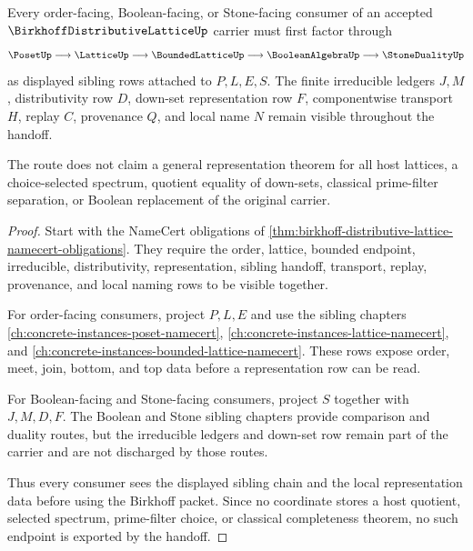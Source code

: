 \begin{theorem}
\label{thm:birkhoff-distributive-lattice-sibling-handoff}
Every order-facing, Boolean-facing, or Stone-facing consumer of an accepted $\BirkhoffDistributiveLatticeUp$ carrier must first factor through
$$
\PosetUp \longrightarrow \LatticeUp \longrightarrow \BoundedLatticeUp \longrightarrow \BooleanAlgebraUp \longrightarrow \StoneDualityUp
$$
as displayed sibling rows attached to $P,L,E,S$. The finite irreducible ledgers $J,M$, distributivity row $D$, down-set representation row $F$, componentwise transport $H$, replay $C$, provenance $Q$, and local name $N$ remain visible throughout the handoff.

The route does not claim a general representation theorem for all host lattices, a choice-selected spectrum, quotient equality of down-sets, classical prime-filter separation, or Boolean replacement of the original carrier.
\end{theorem}
\begin{proof}
Start with the NameCert obligations of \autoref{thm:birkhoff-distributive-lattice-namecert-obligations}. They require the order, lattice, bounded endpoint, irreducible, distributivity, representation, sibling handoff, transport, replay, provenance, and local naming rows to be visible together.

For order-facing consumers, project $P,L,E$ and use the sibling chapters \autoref{ch:concrete-instances-poset-namecert}, \autoref{ch:concrete-instances-lattice-namecert}, and \autoref{ch:concrete-instances-bounded-lattice-namecert}. These rows expose order, meet, join, bottom, and top data before a representation row can be read.

For Boolean-facing and Stone-facing consumers, project $S$ together with $J,M,D,F$. The Boolean and Stone sibling chapters provide comparison and duality routes, but the irreducible ledgers and down-set row remain part of the carrier and are not discharged by those routes.

Thus every consumer sees the displayed sibling chain and the local representation data before using the Birkhoff packet. Since no coordinate stores a host quotient, selected spectrum, prime-filter choice, or classical completeness theorem, no such endpoint is exported by the handoff.
\end{proof}


